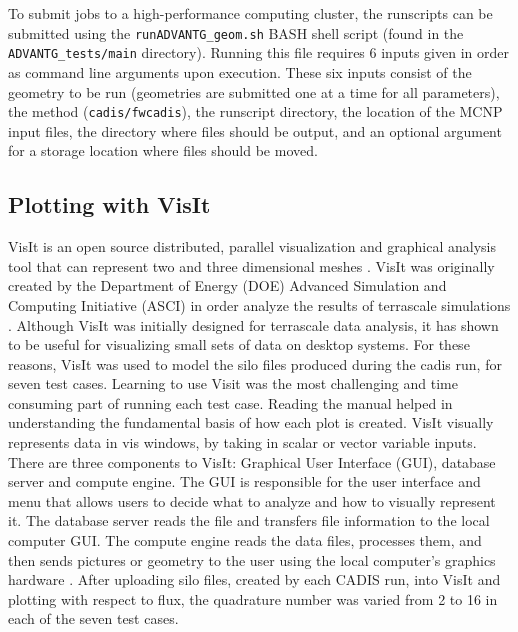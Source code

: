 \documentclass[10pt]{article}
\begin{document}
    To submit jobs to a high-performance computing cluster, the runscripts can be submitted using the \texttt{runADVANTG_geom.sh} BASH shell script (found in the \texttt{ADVANTG_tests/main} directory). Running this file requires 6 inputs given in order as command line arguments upon execution. These six inputs consist of the geometry to be run (geometries are submitted one at a time for all parameters), the method (\texttt{cadis/fwcadis}), the runscript directory, the location of the MCNP input files, the directory where files should be output, and an optional argument for a storage location where files should be moved. 
    
\subsection{Plotting with VisIt}

	VisIt is an open source distributed, parallel visualization and graphical analysis tool that can represent two and three dimensional meshes \cite{llnl:visit}. VisIt was originally created by the Department of Energy (DOE) Advanced Simulation and Computing Initiative (ASCI) in order analyze the results of terrascale simulations \cite{llnl:visit}. Although VisIt was initially designed for terrascale data analysis, it has shown to be useful for visualizing small sets of data on desktop systems. For these reasons, VisIt was used to model the silo files produced during the cadis run, for seven test cases. 
	Learning to use Visit was the most challenging and time consuming part of running each test case. Reading the manual helped in understanding the fundamental basis of how each plot is created. VisIt visually represents data in vis windows, by taking in scalar or vector variable inputs. There are three components to VisIt: Graphical User Interface (GUI), database server and compute engine. The GUI is responsible for the user interface and menu that allows users to decide what to analyze and how to visually represent it. The database server reads the file and transfers file information to the local computer GUI. The compute engine reads the data files, processes them, and then sends pictures or geometry to the user using the local computer’s graphics hardware \cite{software:visit}.
	After uploading silo files, created by each CADIS run, into VisIt and plotting with respect to flux, the quadrature number was varied from 2 to 16 in each of the seven test cases. 
\end{document}
